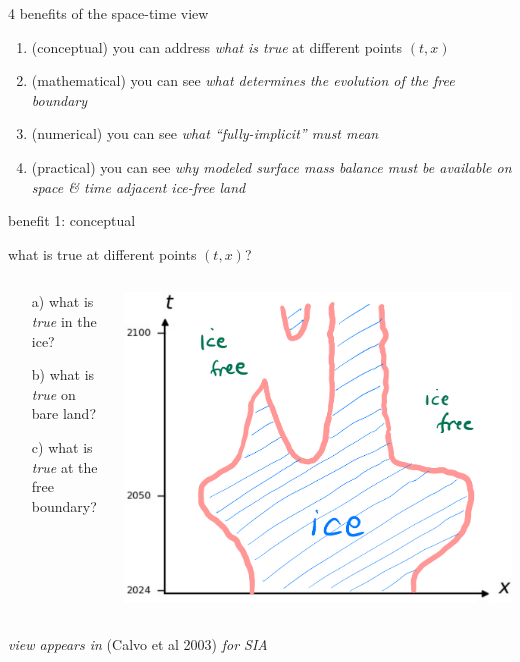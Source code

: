 \documentclass[10pt,dvipsnames]{beamer}
\begin{document}
\begin{frame}{4 benefits of the space-time view}

\begin{enumerate}
\item \alert{(conceptual)} you can address \emph{what is true} at different points $(t,x)$
\item \alert{(mathematical)} you can see \emph{what determines the evolution of the free boundary}
\item \alert{(numerical)} you can see \emph{what ``fully-implicit'' must mean}
\item \alert{(practical)} you can see \emph{why modeled surface mass balance must be available on space \& time adjacent ice-free land}
\end{enumerate}

\end{frame}


\newcommand{\viewin}[1]{{\color{blue} {\footnotesize \emph{view appears in} #1}}}

\begin{frame}{benefit 1: conceptual}

what is true at different points $(t,x)$?

\bigskip \bigskip

\begin{columns}
\begin{column}{0.3\textwidth}
\begin{itemize}
\item[a)] what is \emph{true} in the ice?
\item[b)] what is \emph{true} on bare land?
\item[c)] what is \emph{true} at the free boundary?
\end{itemize}\end{column}
\begin{column}{0.7\textwidth}
\hfill \includegraphics[width=\textwidth]{xtcrop}
\end{column}
\end{columns}

\bigskip
\viewin{(Calvo et al 2003) \emph{for SIA}}
\end{frame}
\end{document}
